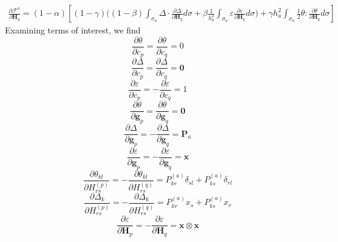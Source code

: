 \documentclass[11pt]{article} %
\begin{document}
\begin{eqnarray}
	\frac{\partial \mathcal{F}^a}{\partial \mathbf{H}_q} = (1-\alpha) \left[ (1-\gamma) \bigg( (1-\beta) \int_{\sigma_a} \Delta \cdot \frac{\partial \Delta}{\partial \mathbf{H}_q} d \sigma + \beta \frac{1}{h_a^2} \int_{\sigma_a} \varepsilon \frac{\partial \varepsilon}{\partial \mathbf{H}_q} d \sigma \bigg) + \gamma h_a^2 \int_{\sigma_a} \frac{1}{2} \theta \colon \frac{\partial \theta}{\partial \mathbf{H}_q} d \sigma \right]
\end{eqnarray}
Examining terms of interest, we find
\begin{equation}
	\frac{\partial \theta}{\partial c_p} = \frac{\partial \theta}{\partial c_q} = 0
\end{equation}
\begin{equation}
	\frac{\partial \Delta}{\partial c_p} = \frac{\partial \Delta}{\partial c_q} = \mathbf{0}
\end{equation}
\begin{equation}
	\frac{\partial \varepsilon}{\partial c_p} = - \frac{\partial \varepsilon}{\partial c_q} = 1
\end{equation}
\begin{equation}
	\frac{\partial \theta}{\partial \mathbf{g}_p} = \frac{\partial \theta}{\partial \mathbf{g}_q} = \mathbf{0}
\end{equation}
\begin{equation}
	\frac{\partial \Delta}{\partial \mathbf{g}_p} = - \frac{\partial \Delta}{\partial \mathbf{g}_q} = \mathbf{P}_a
\end{equation}
\begin{equation}
	\frac{\partial \varepsilon}{\partial \mathbf{g}_p} = - \frac{\partial \varepsilon}{\partial \mathbf{g}_q} = \mathbf{x}
\end{equation}
\begin{equation}
	\frac{\partial \theta_{kl}}{\partial H_{rs}^{(p)}} = - \frac{\partial \theta_{kl}}{\partial H_{rs}^{(q)}} = P^{(a)}_{kr} \delta_{sl} + P^{(a)}_{ks} \delta_{rl}
\end{equation}
\begin{equation}
	\frac{\partial \Delta_k}{\partial H_{rs}^{(p)}} = - \frac{\partial \Delta_k}{\partial H_{rs}^{(q)}} = P^{(a)}_{kr} x_s + P^{(a)}_{ks} x_r
\end{equation}
\begin{equation}
	\frac{\partial \varepsilon}{\partial \mathbf{H}_p} = - \frac{\partial \varepsilon}{\partial \mathbf{H}_q} = \mathbf{x} \otimes \mathbf{x}
\end{equation}
\end{document}

